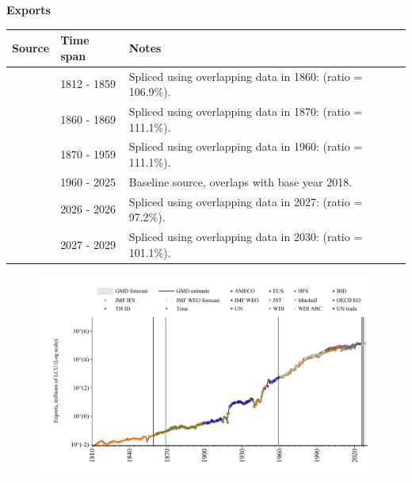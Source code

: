 \documentclass[12pt,a4paper,landscape]{article}
\begin{document}
\begin{adjustbox}{max totalsize={\paperwidth}{\paperheight},center}
\begin{minipage}[t][\textheight][t]{\textwidth}
\vspace*{0.5cm}
{}
\begin{center}
{\Large\bfseries Exports}
\end{center}
\vspace{0.5cm}
\begin{table}[H]
\centering
\small
\begin{tabular}{|l|l|l|}
\hline
\textbf{Source} & \textbf{Time span} & \textbf{Notes} \\
\hline
\rowcolor{white}\cite{Mitchell}& 1812 - 1859 &Spliced using overlapping data in 1860: (ratio = 106.9\%). \\
\rowcolor{lightgray}\cite{Tena}& 1860 - 1869 &Spliced using overlapping data in 1870: (ratio = 111.1\%). \\
\rowcolor{white}\cite{JST}& 1870 - 1959 &Spliced using overlapping data in 1960: (ratio = 111.1\%). \\
\rowcolor{lightgray}\cite{OECD_EO}& 1960 - 2025 &Baseline source, overlaps with base year 2018. \\
\rowcolor{white}\cite{AMECO}& 2026 - 2026 &Spliced using overlapping data in 2027: (ratio = 97.2\%). \\
\rowcolor{lightgray}\cite{IMF_WEO_forecast}& 2027 - 2029 &Spliced using overlapping data in 2030: (ratio = 101.1\%). \\
\hline
\end{tabular}
\end{table}
\begin{figure}[H]
\centering
\includegraphics[width=\textwidth,height=0.6\textheight,keepaspectratio]{graphs/FIN_exports.pdf}
\end{figure}
\end{minipage}
\end{adjustbox}
\end{document}
